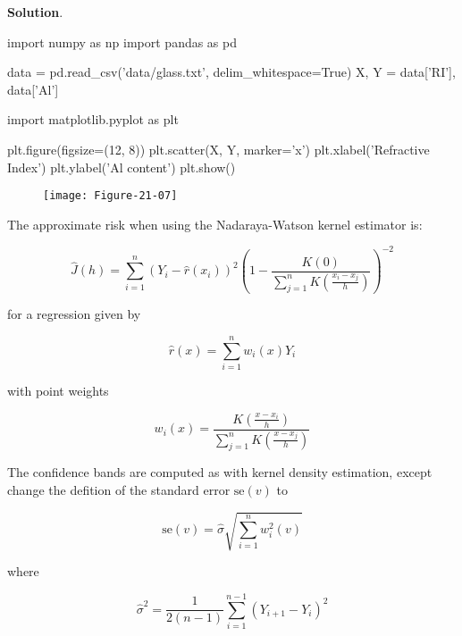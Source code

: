 \textbf{Solution}.

\begin{python}
import numpy as np
import pandas as pd

data = pd.read_csv('data/glass.txt', delim_whitespace=True)
X, Y = data['RI'], data['Al']
\end{python}

\begin{python}
import matplotlib.pyplot as plt

plt.figure(figsize=(12, 8))
plt.scatter(X, Y, marker='x')
plt.xlabel('Refractive Index')
plt.ylabel('Al content')
plt.show()
\end{python}

\begin{figure}[H]
\centering
\texttt{[image: Figure-21-07]}
\end{figure}

The approximate risk when using the Nadaraya-Watson kernel estimator is:

\[ \hat{J}(h) = \sum_{i=1}^{n} (Y_{i} - \hat{r}(x_{i}))^{2} \left( 1 - \frac{K(0)}{\sum_{j=1}^{n} K \left( \frac{x_{i} - x_{j}}{h} \right)} \right)^{-2}\]

for a regression given by

\[ \hat{r}(x) = \sum_{i=1}^{n} w_{i}(x) Y_{i} \]

with point weights

\[ w_{i}(x) = \frac{K\left( \frac{x - x_{i}}{h} \right)}{\sum_{j=1}^{n} K\left( \frac{x - x_{j}}{h} \right)} \]

The confidence bands are computed as with kernel density estimation,
except change the defition of the standard error \(\text{se}(v)\) to

\[ \text{se}(v) = \hat{\sigma} \sqrt{\sum_{i=1}^{n} w^{2}_{i}(v)} \]

where

\[ \hat{\sigma}^{2} = \frac{1}{2(n - 1)} \sum_{i=1}^{n-1} (Y_{i+1} - Y_{i})^{2}\]

